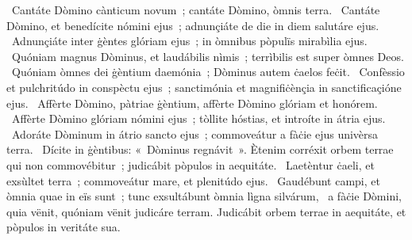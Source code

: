 \psalmChapterWithInscription{}
{ }
{%
~Cantáte Dòmino cànticum novum~; cantáte Dòmino, òmnis terra. 
~Cantáte Dòmino, et benedícite nómini ejus~; adnunçiáte de die in diem salutáre ejus. 
~Adnunçiáte inter ġèntes glóriam ejus~; in òmnibus pòpulïs mirabìlia ejus. 
~Quóniam magnus Dòminus, et laudábilis nìmis~; terrìbilis est super òmnes Deos. 
~Quóniam òmnes dei ġèntium daemónia~; Dòminus autem ċaelos feċit. 
~Confèssio et pulchritúdo in conspèctu ejus~; sanctimónia et magnifiċènçia in sanctificaçióne ejus. 
~Affèrte Dòmino, pàtriae ġèntium, affèrte Dòmino glóriam et honórem. 
~Affèrte Dòmino glóriam nómini ejus~; tòllite hóstias, et introíte in átria ejus. 
~Adoráte Dòminum in átrio sancto ejus~; commoveátur a fàċie ejus univèrsa terra. 
~Dícite in ġèntibus: «~Dòminus regnávit~». Ètenim corréxit orbem terrae qui non commovébitur~; judicábit pòpulos in aequitáte. 
~Laetèntur ċaeli, et exsùltet terra~; commoveátur mare, et plenitúdo ejus. 
~Gaudébunt campi, et òmnia quae in eïs sunt~; tunc exsultábunt òmnia lìgna silvárum, 
~a fàċie Dòmini, quia vënit, quóniam vënit judicáre terram. Judicábit orbem terrae in aequitáte, et pòpulos in veritáte sua. 
}
